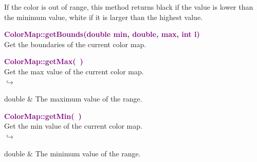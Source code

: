 \begin{tcolorbox}[width=\textwidth,myArgs,tabularx={ll|R}]


\end{tcolorbox}

If the color is out of range, this method returns black if the value is lower than the minimum value, white if it is larger than the highest value.

\textcolor{purple}{\textbf{ColorMap::getBounds(double min, double, max, int l)}}\label{ColorMap::getBounds(double min, double, max, int l)}\\
Get the boundaries of the current color map.

\begin{tcolorbox}[width=\textwidth,myArgs,tabularx={ll|R}]



\end{tcolorbox}


\textcolor{purple}{\textbf{ColorMap::getMax(~)}}\label{ColorMap::getMax()}\\
Get the max value of the current color map.\\ \hspace*{5mm}$\hookrightarrow$
\vspace*{-2em}\begin{tcolorbox}[grow to left by=-1cm, width=\textwidth-1cm,myArgs,tabularx={l|R}]
double & The maximum value of the range.
\end{tcolorbox}


\textcolor{purple}{\textbf{ColorMap::getMin(~)}}\label{ColorMap::getMin()}\\
Get the min value of the current color map.\\ \hspace*{5mm}$\hookrightarrow$
\vspace*{-2em}\begin{tcolorbox}[grow to left by=-1cm, width=\textwidth-1cm,myArgs,tabularx={l|R}]
double & The minimum value of the range.
\end{tcolorbox}

